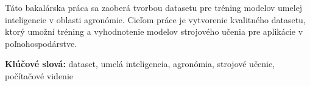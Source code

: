 Táto bakalárska práca sa zaoberá tvorbou datasetu pre tréning modelov umelej inteligencie v oblasti agronómie. Cieľom práce je vytvorenie kvalitného datasetu, ktorý umožní tréning a vyhodnotenie modelov strojového učenia pre aplikácie v poľnohospodárstve.

\textbf{Klúčové slová:} dataset, umelá inteligencia, agronómia, strojové učenie, počítačové videnie
